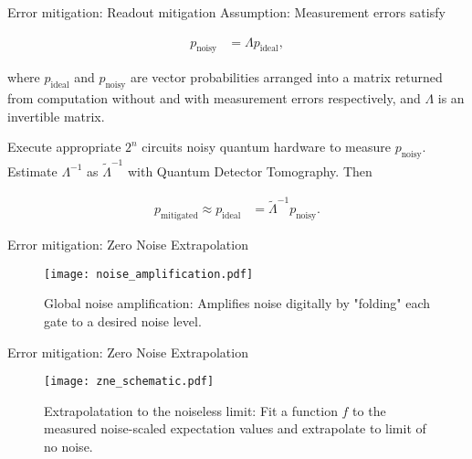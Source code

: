 \begin{frame}{Error mitigation: Readout mitigation}
  Assumption: Measurement errors satisfy

  \begin{align*}
    p_\text{noisy} &=  \Lambda p_\text{ideal},
  \end{align*}

  where $p_\text{ideal}$ and $p_\text{noisy}$ are vector probabilities arranged
  into a matrix returned from computation without and with measurement errors
  respectively, and $\Lambda$ is an invertible matrix.

  \vspace{2ex}

  Execute appropriate $2^n$ circuits noisy quantum hardware to measure
  $p_\text{noisy}$. Estimate $\Lambda^{-1}$ as $\tilde{\Lambda}^{-1}$ with {\color{red}Quantum Detector
  Tomography}. Then

  \begin{align*}
    p_\text{mitigated} \approx p_\text{ideal} &= \tilde{\Lambda}^{-1}p_\text{noisy}.
  \end{align*}


\end{frame}


\begin{frame}{Error mitigation: Zero Noise Extrapolation}
   \begin{figure}
    \centering
    \texttt{[image: noise\_amplification.pdf]}
     \caption{Global noise amplification: Amplifies noise digitally by "folding" each gate to a desired noise level.}
  \end{figure}
\end{frame}


\begin{frame}{Error mitigation: Zero Noise Extrapolation}
  \begin{figure}
    \centering
    \texttt{[image: zne\_schematic.pdf]}
    \caption{Extrapolatation to the noiseless limit: Fit a function $f$ to the measured noise-scaled expectation values and extrapolate to limit of no noise.}
  \end{figure}
\end{frame}


